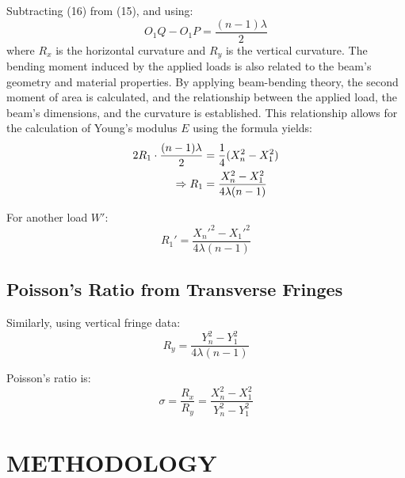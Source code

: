 \documentclass[a4paper,11pt]{article}
\begin{document}
Subtracting (16) from (15), and using:
\begin{equation}
O_1Q - O_1P = \frac{(n-1)\lambda}{2}
\end{equation}
where \(R_x\) is the horizontal curvature and \(R_y\) is the vertical curvature. The bending moment induced by the applied loads is also related to the beam's geometry and material properties. By applying beam-bending theory, the second moment of area is calculated, and the relationship between the applied load, the beam's dimensions, and the curvature is established. This relationship allows for the calculation of Young's modulus \(E\) using the formula
yields:
\begin{align}
2R_1 \cdot \frac{(n-1)\lambda}{2} &= \frac{1}{4}(X_n^2 - X_1^2) \notag \\
\Rightarrow R_1 &= \frac{X_n^2 - X_1^2}{4\lambda(n-1)}
\end{align}

For another load \( W' \):
\begin{equation}
R_1' = \frac{X_n'^2 - X_1'^2}{4\lambda(n-1)}
\end{equation}

\subsection*{Poisson's Ratio from Transverse Fringes}

Similarly, using vertical fringe data:
\begin{equation}
R_y = \frac{Y_n^2 - Y_1^2}{4\lambda(n-1)}
\end{equation}

Poisson's ratio is:
\begin{equation}
\sigma = \frac{R_x}{R_y} = \frac{X_n^2 - X_1^2}{Y_n^2 - Y_1^2}
\end{equation}

\newpage
\section{\centering METHODOLOGY}
\label{sec:METHODOLOGY}
\indent
\end{document}
